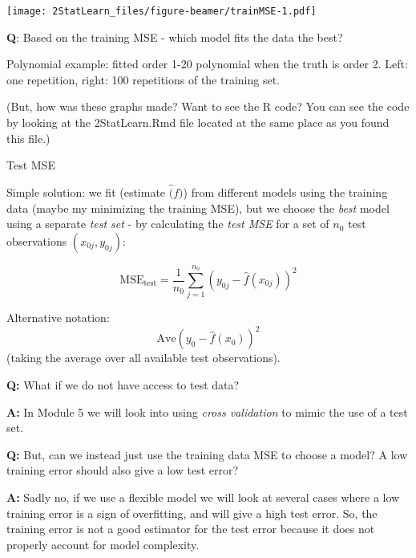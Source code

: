 \documentclass[ignorenonframetext,]{beamer}
\begin{document}
\begin{frame}

\texttt{[image: 2StatLearn\_files/figure-beamer/trainMSE-1.pdf]}

\textbf{Q}: Based on the training MSE - which model fits the data the
best?

Polynomial example: fitted order 1-20 polynomial when the truth is order
2. Left: one repetition, right: 100 repetitions of the training set.

(But, how was these graphs made? Want to see the R code? You can see the
code by looking at the 2StatLearn.Rmd file located at the same place as
you found this file.)

\end{frame}

\begin{frame}

\begin{block}{Test MSE}

Simple solution: we fit (estimate \(\hat(f)\)) from different models
using the training data (maybe my minimizing the training MSE), but we
choose the \emph{best} model using a separate \emph{test set} - by
calculating the \emph{test MSE} for a set of \(n_0\) test observations
\((x_{0j},y_{0j})\):

\[ \text{MSE}_{\text{test}}=\frac{1}{n_0}\sum_{j=1}^{n_0} (y_{0j}-\hat{f}(x_{0j}))^2\]

Alternative notation: \[\text{Ave}(y_0-\hat{f}(x_0))^2\] (taking the
average over all available test observations).

\end{block}

\end{frame}

\begin{frame}

\textbf{Q:} What if we do not have access to test data?

\textbf{A:} In Module 5 we will look into using \emph{cross validation}
to mimic the use of a test set.

\textbf{Q:} But, can we instead just use the training data MSE to choose
a model? A low training error should also give a low test error?

\textbf{A:} Sadly no, if we use a flexible model we will look at several
cases where a low training error is a sign of overfitting, and will give
a high test error. So, the training error is not a good estimator for
the test error because it does not properly account for model
complexity.

\end{frame}
\end{document}
